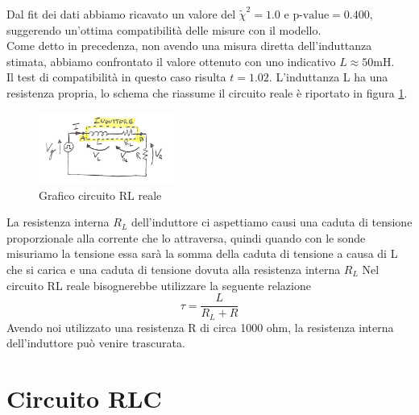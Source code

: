 \documentclass[letterpaper,12pt]{article}
\begin{document}
Dal fit dei dati abbiamo ricavato un valore del $\widetilde{\chi}^2 = 1.0$ e $\text{p-value} = 0.400$, suggerendo un'ottima compatibilità delle misure con il modello.\\
Come detto in precedenza, non avendo una misura diretta dell'induttanza stimata, abbiamo confrontato il valore ottenuto con uno indicativo $L \approx 50 \text{mH}$.\\
Il test di compatibilità in questo caso risulta $t = 1.02$.
L'induttanza L ha una resistenza propria, lo schema che riassume il circuito reale è riportato in figura \ref{fig:reale}. \\
\begin{figure}[h!] 
  \centering
\includegraphics[width=0.4\textwidth]{RL reale.png} 
  \caption{Grafico circuito RL reale}
  \label{fig:reale}
\end{figure}
La resistenza interna $R_L$ dell'induttore ci aspettiamo causi una caduta di tensione proporzionale alla corrente che lo attraversa, quindi quando con le sonde misuriamo la tensione essa sarà la somma della caduta di tensione a causa di L che si carica e una caduta di tensione dovuta alla resistenza interna $R_L$
Nel circuito RL reale bisognerebbe utilizzare la seguente relazione $$\tau = \frac{L}{R_L + R}$$
Avendo noi utilizzato una resistenza R di circa 1000 ohm, la resistenza interna dell'induttore può venire trascurata.


\section{Circuito RLC}
\end{document}
